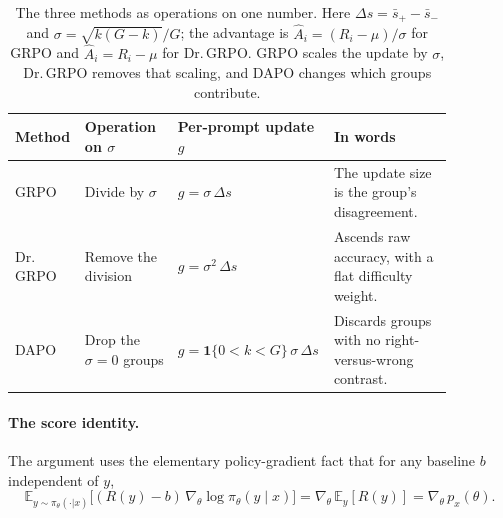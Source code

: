 \documentclass[11pt]{article}
\theoremstyle{plain}
\theoremstyle{definition}
\newcommand{\E}{\mathbb{E}}
\newcommand{\Adv}{\hat{A}}
\begin{document}
\begin{table}[H]
\centering
\small
\setlength{\tabcolsep}{7pt}
\renewcommand{\arraystretch}{1.4}
\begin{tabular}{@{}p{0.12\linewidth}p{0.21\linewidth}p{0.27\linewidth}p{0.27\linewidth}@{}}
\toprule
\textbf{Method} & \textbf{Operation on $\sigma$} & \textbf{Per-prompt update $g$} & \textbf{In words} \\
\midrule
GRPO & Divide by $\sigma$ & $g=\sigma\,\Delta s$ & The update size is the group's disagreement. \\
\addlinespace[4pt]
Dr.\,GRPO & Remove the division & $g=\sigma^{2}\,\Delta s$ & Ascends raw accuracy, with a flat difficulty weight. \\
\addlinespace[4pt]
DAPO & Drop the $\sigma=0$ groups & $g=\mathbf{1}\{0<k<G\}\,\sigma\,\Delta s$ & Discards groups with no right-versus-wrong contrast. \\
\bottomrule
\end{tabular}
\caption{The three methods as operations on one number. Here $\Delta s=\bar s_+-\bar s_-$ and $\sigma=\sqrt{k(G-k)}/G$; the advantage is $\Adv_i=(R_i-\mu)/\sigma$ for GRPO and $\Adv_i=R_i-\mu$ for Dr.\,GRPO. GRPO scales the update by $\sigma$, Dr.\,GRPO removes that scaling, and DAPO changes which groups contribute.}
\label{tab:threeops}
\end{table}

\paragraph{The score identity.} The argument uses the elementary policy-gradient fact that for any baseline $b$ independent of $y$,
\begin{equation}
\label{eq:score}
\E_{y\sim\pi_\theta(\cdot|x)}\!\big[(R(y)-b)\,\nabla_\theta\log\pi_\theta(y\mid x)\big]
=\nabla_\theta\,\E_y[R(y)] = \nabla_\theta\,p_x(\theta).
\end{equation}
\end{document}
